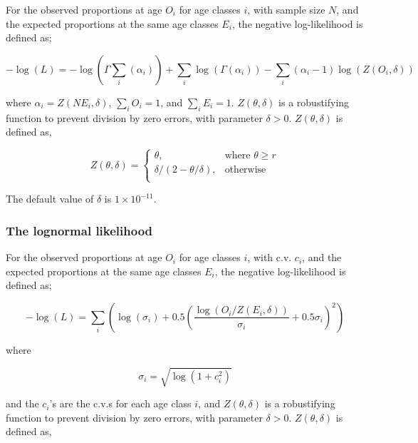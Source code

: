 {{{{For the observed proportions at age $O_i$ for age classes $i$, with sample size $N$, and the expected proportions at the same age classes $E_i$, the negative log-likelihood is defined as; 

\begin{equation}
-\log \left(L \right) = -\log(\Gamma \sum\limits_i (\alpha_i)) + \sum\limits_i \log(\Gamma (\alpha_i)) - \sum\limits_i (\alpha_i-1) \log(Z(O_i,\delta))
\end{equation}

where $\alpha_i = Z \left(N E_i,\delta \right)$, $\sum\limits_i O_i = 1$, and $\sum\limits_i E_i = 1$. $Z \left(\theta,\delta \right)$ is a robustifying function to prevent division by zero errors, with parameter $\delta>0$. $Z \left(\theta,\delta \right)$ is defined as,

\begin{equation}
Z \left(\theta,\delta \right) = \begin{cases}
\theta, & \text{where $\theta \ge r$} \\
\delta/\left( 2-\theta/\delta \right), & \text{otherwise} \\  
\end{cases}
\end{equation}

The default value of $\delta$ is $1 \times 10^{-11}$.

\subsubsection*{The lognormal likelihood}

For the observed proportions at age $O_i$ for age classes $i$, with c.v. $c_i$, and the expected proportions at the same age classes $E_i$, the negative log-likelihood is defined as; 

\begin{equation}
- \log \left(L \right) = \sum\limits_i \left( \log \left( \sigma _i \right) + 0.5\left( \frac{\log \left(O_i / Z \left(E_i,\delta \right) \right)}{\sigma_i} + 0.5 \sigma_i \right)^2 \right)
\end{equation}

where 

\begin{equation}
\sigma_i  = \sqrt{\log \left(1+c_i^2 \right)}
\end{equation}

and the $c_i$'s are the c.v.s for each age class $i$, and $Z \left(\theta,\delta \right)$ is a robustifying function to prevent division by zero errors, with parameter $\delta>0$. $Z \left(\theta,\delta \right)$ is defined as,

}}}}

